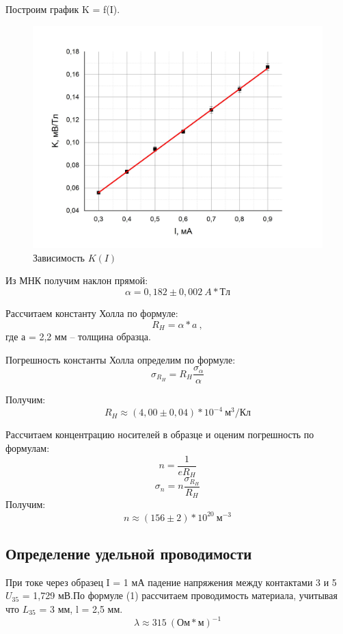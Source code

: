 \documentclass[a4paper,12pt]{article}
\begin{document}
Построим график K = f(I).
	\begin{figure}[h]
		\begin{center}
		\includegraphics[scale=0.2]{graph3}
		\end{center}
		\caption{Зависимость $K(I)$}
		\end{figure}
		
Из МНК получим наклон прямой:
$$
	\alpha = 0,182 \pm 0,002 \ A * Тл
$$

\newpage

Рассчитаем константу Холла по формуле:
$$
	R_H = \alpha * a \ ,
$$
где а = 2,2 мм -- толщина образца.

\vspace{2 mm}
Погрешность константы Холла определим по формуле:
$$
	\sigma_{R_H} = R_H \frac{\sigma_{\alpha}}{\alpha}
$$

Получим:
$$
	R_H \approx (4,00 \pm 0,04)*10^{-4} \ м^3/Кл
$$

Рассчитаем концентрацию носителей в образце и оценим погрешность по формулам:
$$
	n = \frac{1}{eR_H}
$$
$$	
	\sigma_n = n \frac{\sigma_{R_H}}{R_H}
$$
Получим:
$$
	n \approx (156 \pm 2)*10^{20} \ м^{-3}
$$


\subsection*{Определение удельной проводимости}

При токе через образец I = 1 мА падение напряжения между контактами 3 и 5  $U_{35}$ = 1,729 мВ.По формуле (1) рассчитаем проводимость материала, учитывая что $L_{35}$ = 3 мм, l = 2,5 мм.
$$
	\lambda \approx 315 \ (Ом*м)^{-1}
$$
\end{document}
